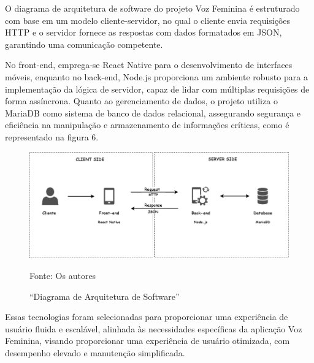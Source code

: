 \documentclass[
    article,			%
    12pt,				%
    oneside,            %
    a4paper,			%
    english,			%
    brazil,				%
    ]{abntex2}
\begin{document}
    O diagrama de arquitetura de software do projeto Voz Feminina é estruturado com base em um modelo cliente-servidor, no qual o cliente envia requisições HTTP e o servidor fornece as respostas com dados formatados em JSON, garantindo uma comunicação competente.
    
    No front-end, emprega-se React Native para o desenvolvimento de interfaces móveis, enquanto no back-end, Node.js proporciona um ambiente robusto para a implementação da lógica de servidor, capaz de lidar com múltiplas requisições de forma assíncrona.  Quanto ao gerenciamento de dados, o projeto utiliza o MariaDB como sistema de banco de dados relacional, assegurando segurança e eficiência na manipulação e armazenamento de informações críticas, como é representado na figura 6.

\begin{figure}[ht]
    \centering
    \includegraphics[width=15cm]{ArquiteturaSoftware.png}\\
    \caption{“Diagrama de Arquitetura de Software”}
        Fonte: Os autores
    \label{fig:infografico}
\end{figure}

    Essas tecnologias foram selecionadas para proporcionar uma experiência de usuário fluida e escalável, alinhada às necessidades específicas da aplicação Voz Feminina, visando proporcionar uma experiência de usuário otimizada, com desempenho elevado e manutenção simplificada.
    

\end{document}
